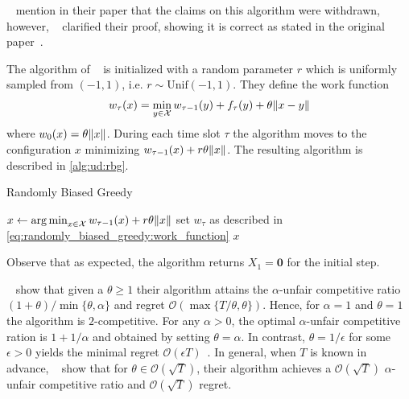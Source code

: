 \citeauthor*{Bansal2015}~\cite{Bansal2015} mention in their paper that the claims on this algorithm were withdrawn, however, \citeauthor*{Andrew2015}~\cite{Andrew2015} clarified their proof, showing it is correct as stated in the original paper~\cite{Wierman}.

The algorithm of \citeauthor*{Andrew2015}~\cite{Andrew2015} is initialized with a random parameter $r$ which is uniformly sampled from $({-1,1})$, i.e. $r \sim \text{Unif}(-1, 1)$. They define the work function \begin{align}\label{eq:randomly_biased_greedy:work_function}
    w_{\tau}(x) = \min_{y \in \mathcal{X}} w_{\tau-1}(y) + f_{\tau}(y) + \theta \lVert x - y\rVert
\end{align} where $w_0(x) = \theta \lVert x\rVert$. During each time slot $\tau$ the algorithm moves to the configuration $x$ minimizing $w_{\tau-1}(x) + r \theta \lVert x\rVert$. The resulting algorithm is described in \cref{alg:ud:rbg}.

\begin{algorithm}
    \caption{Randomly Biased Greedy~\cite{Andrew2015}}\label{alg:ud:rbg}
    $x \gets \operatorname*{arg\,min}_{x \in \mathcal{X}} w_{\tau-1}(x) + r \theta \lVert x\rVert$\;
    set $w_{\tau}$ as described in \cref{eq:randomly_biased_greedy:work_function}\;
    \Return $x$\;
\end{algorithm}

Observe that as expected, the algorithm returns $X_1 = \mathbf{0}$ for the initial step.

\citeauthor*{Andrew2015}~\cite{Andrew2015} show that given a $\theta \geq 1$ their algorithm attains the $\alpha$-unfair competitive ratio $(1+\theta) / \min \{\theta, \alpha\}$ and regret $\mathcal{O}(\max \{T / \theta, \theta\})$. Hence, for $\alpha = 1$ and $\theta = 1$ the algorithm is $2$-competitive. For any $\alpha > 0$, the optimal $\alpha$-unfair competitive ration is $1 + 1 / \alpha$ and obtained by setting $\theta = \alpha$. In contrast, $\theta = 1 / \epsilon$ for some $\epsilon > 0$ yields the minimal regret $\mathcal{O}(\epsilon T)$~\cite{Andrew2015}. In general, when $T$ is known in advance, \citeauthor*{Andrew2015}~\cite{Andrew2015} show that for $\theta \in \mathcal{O}(\sqrt{T})$, their algorithm achieves a $\mathcal{O}(\sqrt{T})$ $\alpha$-unfair competitive ratio and $\mathcal{O}(\sqrt{T})$ regret.

